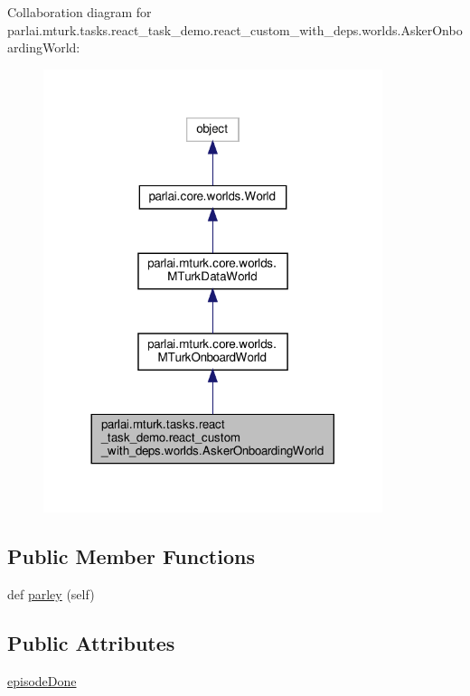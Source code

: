Collaboration diagram for parlai.\+mturk.\+tasks.\+react\+\_\+task\+\_\+demo.\+react\+\_\+custom\+\_\+with\+\_\+deps.\+worlds.\+Asker\+Onboarding\+World\+:
\nopagebreak
\begin{figure}[H]
\begin{center}
\leavevmode
\includegraphics[width=281pt]{classparlai_1_1mturk_1_1tasks_1_1react__task__demo_1_1react__custom__with__deps_1_1worlds_1_1AskerOnboardingWorld__coll__graph}
\end{center}
\end{figure}
\subsection*{Public Member Functions}
\begin{DoxyCompactItemize}
\item 
def \hyperlink{classparlai_1_1mturk_1_1tasks_1_1react__task__demo_1_1react__custom__with__deps_1_1worlds_1_1AskerOnboardingWorld_a96305c83fbb8cdfd739ed15291523cd5}{parley} (self)
\end{DoxyCompactItemize}
\subsection*{Public Attributes}
\begin{DoxyCompactItemize}
\item 
\hyperlink{classparlai_1_1mturk_1_1tasks_1_1react__task__demo_1_1react__custom__with__deps_1_1worlds_1_1AskerOnboardingWorld_ad3efea9a7b7fb64de85792f4ec9e91bd}{episode\+Done}
\end{DoxyCompactItemize}


